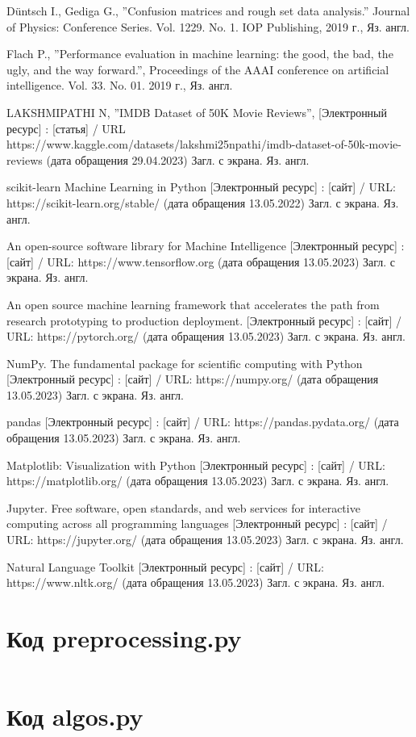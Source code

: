 \documentclass[bachelor, och, coursework]{SCWorks}
\begin{document}
\begin{thebibliography}{99}
     Düntsch I., Gediga G., ''Confusion matrices and rough set data
    analysis.'' Journal of Physics: Conference Series. Vol. 1229. No. 1. IOP
    Publishing, 2019 г., Яз. англ.

     Flach P., ''Performance evaluation in machine learning: the
    good, the bad, the ugly, and the way forward.'', Proceedings of the AAAI
    conference on artificial intelligence. Vol. 33. No. 01. 2019 г., Яз. англ.


     LAKSHMIPATHI N, ''IMDB Dataset of 50K Movie Reviews'',
    [Электронный ресурс] : [статья] / URL
    https://www.kaggle.com/datasets/lakshmi25npathi/imdb-dataset-of-50k-movie-reviews
    (дата обращения 29.04.2023) Загл. с экрана. Яз. англ.


     scikit-learn Machine Learning in Python [Электронный
    ресурс] : [сайт] / URL: https://scikit-learn.org/stable/ (дата обращения
    13.05.2022) Загл. с экрана. Яз. англ.

     An open-source software library for Machine Intelligence
    [Электронный ресурс] : [сайт] / URL: https://www.tensorflow.org (дата
    обращения 13.05.2023) Загл. с экрана. Яз. англ.

     An open source machine learning framework that
    accelerates the path from research prototyping to production deployment.
    [Электронный ресурс] : [сайт] / URL: https://pytorch.org/ (дата обращения
    13.05.2023) Загл. с экрана. Яз. англ.

     NumPy. The fundamental package for scientific computing
    with Python [Электронный ресурс] : [сайт] / URL: https://numpy.org/ (дата
    обращения 13.05.2023) Загл. с экрана. Яз. англ.

     pandas [Электронный ресурс] : [сайт] / URL:
    https://pandas.pydata.org/ (дата обращения 13.05.2023) Загл. с экрана. Яз.
    англ.

     Matplotlib: Visualization with Python
    [Электронный ресурс] : [сайт] / URL: https://matplotlib.org/ (дата обращения
    13.05.2023) Загл. с экрана. Яз. англ.

     Jupyter. Free software, open standards, and web
    services for interactive computing across all programming languages
    [Электронный ресурс] : [сайт] / URL: https://jupyter.org/ (дата обращения
    13.05.2023) Загл. с экрана. Яз. англ.

     Natural Language Toolkit [Электронный ресурс] : [сайт]
    / URL: https://www.nltk.org/ (дата обращения 13.05.2023) Загл. с экрана. Яз.
    англ.

\end{thebibliography}

\appendix

    \section{Код preprocessing.py}
    \inputminted{py}{../movie-review-data/preprocessing.py}

    \section{Код algos.py}
    \inputminted{py}{../movie-review-data/algos.py}
\end{document}
